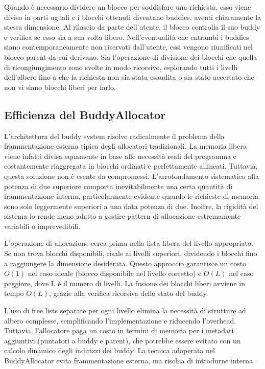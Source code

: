 Quando è necessario dividere un blocco per soddisfare una richiesta, esso viene diviso in parti uguali e i blocchi ottenuti diventano buddies, aventi chiaramente la stessa dimensione. Al rilascio da parte dell’utente, il blocco controlla il suo buddy e verifica se esso sia a sua volta libero. Nell’eventualità che entrambi i buddies siano contemporaneamente non riservati dall’utente, essi vengono riunificati nel blocco parent da cui derivano. Sia l'operazione di divisione dei blocchi che quella di ricongiungimento sono svolte in modo ricorsivo, esplorando tutti i livelli dell'albero fino a che la richiesta non sia stata esaudita o sia stato accertato che non vi siano blocchi liberi per farlo. 

\subsection*{Efficienza del BuddyAllocator}
L’architettura del buddy system risolve radicalmente il problema della frammentazione esterna tipica degli allocatori tradizionali. La memoria libera viene infatti divisa equamente in base alle necessità reali del programma e costantemente riaggregata in blocchi ordinati e perfettamente allineati. Tuttavia, questa soluzione non è esente da compromessi. L'arrotondamento sistematico alla potenza di due superiore comporta inevitabilmente una certa quantità di frammentazione interna, particolarmente evidente quando le richieste di memoria sono solo leggermente superiori a una data potenza di due. Inoltre, la rigidità del sistema lo rende meno adatto a gestire pattern di allocazione estremamente variabili o imprevedibili.

L'operazione di allocazione cerca prima nella lista libera del livello appropriato. Se non trova blocchi disponibili, risale ai livelli superiori, dividendo i blocchi fino a raggiungere la dimensione desiderata. Questo approccio garantisce un costo $O(1)$ nel caso ideale (blocco disponibile nel livello corretto) e $O(L)$ nel caso peggiore, dove L è il numero di livelli. La fusione dei blocchi liberi avviene in tempo $O(L)$, grazie alla verifica ricorsiva dello stato del buddy.

L'uso di free lists separate per ogni livello elimina la necessità di strutture ad albero complesse, semplificando l'implementazione e riducendo l'overhead. Tuttavia, l'allocatore paga un costo in termini di memoria per i metadati aggiuntivi (puntatori a buddy e parent), che potrebbe essere evitato con un calcolo dinamico degli indirizzi dei buddy. La tecnica adoperata nel BuddyAllocator evita frammentazione esterna, ma rischia di introdurne interna.

